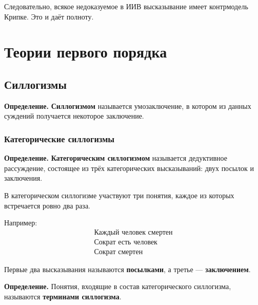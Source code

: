 \documentclass[12pt,a4paper,oneside,openany]{book}
\theoremstyle{definition}
\theoremstyle{plain}
\theoremstyle{remark}
\begin{document}
Следовательно, всякое недоказуемое в ИИВ высказывание имеет
контрмодель Крипке. Это и даёт полноту.










\chapter{Теории первого порядка}
































\section{Силлогизмы}
\textbf{Определение.}
\textbf{Силлогизмом} называется умозаключение, в котором из данных
суждений получается некоторое заключение.

\subsection{Категорические силлогизмы}
\textbf{Определение.}
\textbf{Категорическим силлогизмом} называется дедуктивное
рассуждение, состоящее из трёх категорических высказываний:
двух посылок и заключения.

В категорическом силлогизме участвуют три понятия, каждое из которых
встречается ровно два раза.

Например:
\[
\begin{array}{l}
\text{Каждый человек смертен}\\
\text{Сократ есть человек}\\
\hline
\text{Сократ смертен}
\end{array}
\]

Первые два высказывания называются \textbf{посылками}, а третье ---
\textbf{заключением}.

\textbf{Определение.}
Понятия, входящие в состав категорического силлогизма, называются
\textbf{терминами силлогизма}.
\end{document}
